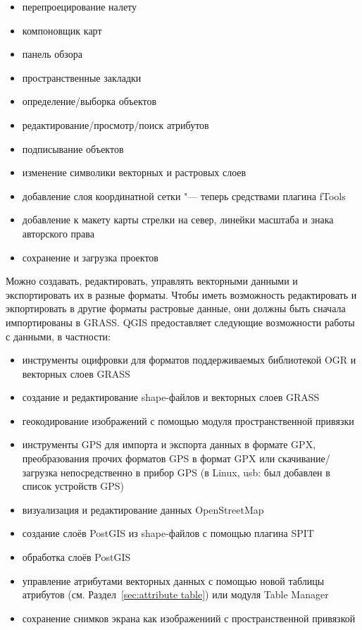 \begin{itemize}[label=--]
\item перепроецирование налету
\item компоновщик карт
\item панель обзора
\item пространственные закладки
\item определение/выборка объектов
\item редактирование/просмотр/поиск атрибутов
\item подписывание объектов
\item изменение символики векторных и растровых слоев
\item добавление слоя координатной сетки "--- теперь средствами плагина
fTools
\item добавление к макету карты стрелки на север, линейки масштаба
и знака авторского права
\item сохранение и загрузка проектов
\end{itemize}


Можно создавать, редактировать, управлять векторными данными и
экспортировать их в разные форматы. Чтобы иметь возможность редактировать
и экпортировать в другие форматы растровые данные, они должны быть
сначала импортированы в GRASS. QGIS предоставляет следующие возможности
работы с данными, в частности:

\begin{itemize}[label=--]
\item инструменты оцифровки для форматов поддерживаемых библиотекой OGR
и векторных слоев GRASS
\item создание и редактирование shape-файлов и векторных слоев GRASS
\item геокодирование изображений с помощью модуля пространственной
привязки
\item инструменты GPS для импорта и экспорта данных в формате GPX,
преобразования прочих форматов GPS в формат GPX или скачивание/загрузка
непосредственно в прибор GPS (в Linux, usb: был добавлен в список
устройств GPS)
\item визуализация и редактирование данных OpenStreetMap
\item создание слоёв PostGIS из shape-файлов с помощью плагина SPIT
\item обработка слоёв PostGIS
\item управление атрибутами векторных данных с помощью новой таблицы
атрибутов (см. Раздел~\ref{sec:attribute table}) или модуля Table Manager
\item сохранение снимков экрана как изображениий с пространственной
привязкой
\end{itemize}

